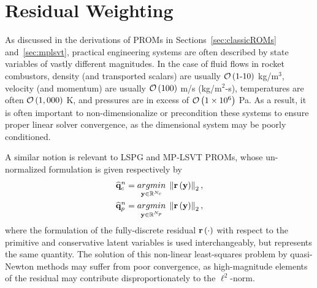 \section{Residual Weighting}\label{sec:resWeight}

As discussed in the derivations of PROMs in Sections~\ref{sec:classicROMs} and~\ref{sec:mplsvt}, practical engineering systems are often described by state variables of vastly different magnitudes. In the case of fluid flows in rocket combustors, density (and transported scalars) are usually $\mathcal{O}\left(1\text{-}10\right)$ kg/m$^3$, velocity (and momentum) are usually $\mathcal{O}\left(100\right)$ m/s (kg/m$^2$-s), temperatures are often $\mathcal{O}\left(1,000\right)$ K, and pressures are in excess of $\mathcal{O}\left(1\times10^6\right)$ Pa. As a result, it is often important to non-dimensionalize or precondition these systems to ensure proper linear solver convergence, as the dimensional system may be poorly conditioned.

A similar notion is relevant to LSPG and MP-LSVT PROMs, whose un-normalized formulation is given respectively by
%
\begin{align}
    \mathbf{\widehat{q}}_{c}^{n} &= \underset{\mathbf{y} \in \mathbb{R}^{N_c}}{argmin} \; \left\Vert \mathbf{r}\left(\mathbf{y}\right) \right\Vert_2, \\
    \mathbf{\widehat{q}}_{p}^{n} &= \underset{\mathbf{y} \in \mathbb{R}^{N_p}}{argmin} \; \left\Vert \mathbf{r}\left(\mathbf{y}\right) \right\Vert_2,
\end{align}
%
where the formulation of the fully-discrete residual $\mathbf{r}\left(\cdot\right)$ with respect to the primitive and conservative latent variables is used interchangeably, but represents the same quantity. The solution of this non-linear least-squares problem by quasi-Newton methods may suffer from poor convergence, as high-magnitude elements of the residual may contribute disproportionately to the $\ell^2$-norm.

